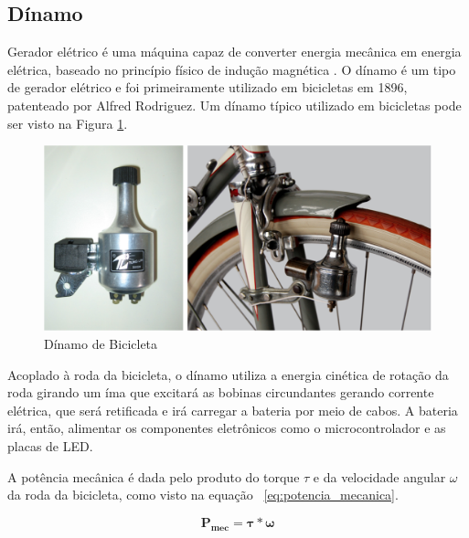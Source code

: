 	\subsection{Dínamo}
	Gerador elétrico é uma máquina capaz de converter energia mecânica em energia elétrica, baseado no princípio físico de indução magnética \cite{maximo}. O dínamo é um tipo de gerador elétrico e foi primeiramente utilizado em bicicletas em 1896, patenteado por Alfred Rodriguez. Um dínamo típico utilizado em bicicletas pode ser visto na Figura \ref{img:dinamo_bicicleta}.
	
	\graphicspath{{figuras/}}
	\begin{figure}[h!]
	\centering
	\includegraphics[scale=0.60]{dinamo_bicicleta}
	\caption{Dínamo de Bicicleta}
	\label{img:dinamo_bicicleta}
	\end{figure}
	
Acoplado à roda da bicicleta, o dínamo utiliza a energia cinética de rotação da roda girando um íma que excitará as bobinas circundantes gerando corrente elétrica, que será retificada e irá carregar a bateria por meio de cabos. A bateria irá, então, alimentar os componentes eletrônicos como o microcontrolador e as placas de LED.

A potência mecânica é dada pelo produto do torque $\tau$ e da velocidade angular $\omega$ da roda da bicicleta, como visto na equação ~\ref{eq:potencia_mecanica}.

\begin{equation}
\label{eq:potencia_mecanica}
\mathbf{P_{mec} = \tau * \omega}
\end{equation}

